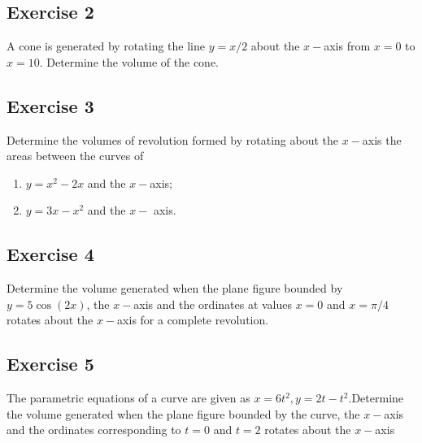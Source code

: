 \documentclass[
  11pt,
  oneside]{book}
\providecommand{\tightlist}{%
  \setlength{\itemsep}{0pt}\setlength{\parskip}{0pt}}
\newcommand{\slide}{}
\theoremstyle{definition}
\theoremstyle{definition}
\theoremstyle{definition}
\theoremstyle{definition}
\theoremstyle{remark}
\begin{document}
\slide

\subsection*{Exercise 2}\label{exercise-2-11}

A cone is generated by rotating the line \(y = x/2\) about the \(x-\)axis from \(x = 0\) to \(x = 10\). Determine the volume of the cone.

\slide

\subsection*{Exercise 3}\label{exercise-3-9}

Determine the volumes of revolution formed by rotating about the \(x-\)axis the areas between the curves of

\begin{enumerate}
\def\labelenumi{\arabic{enumi}.}
\tightlist
\item
  \(y = x^2 - 2x\) and the \(x-\)axis;
\item
  \(y = 3x - x^2\) and the \(x-\) axis.
\end{enumerate}

\slide

\subsection*{Exercise 4}\label{exercise-4-7}

Determine the volume generated when the plane figure bounded by \(y = 5\cos(2x)\), the \(x-\)axis and the ordinates at values \(x = 0\) and \(x = \pi/4\) rotates about the \(x-\)axis for a complete revolution.

\slide

\subsection*{Exercise 5}\label{exercise-5-5}

The parametric equations of a curve are given as \(x = 6t^2, y = 2t - t^2\).Determine the volume generated when the plane figure bounded by the curve, the \(x-\)axis and the ordinates corresponding to \(t = 0\) and \(t = 2\) rotates about the \(x-\)axis
\end{document}
